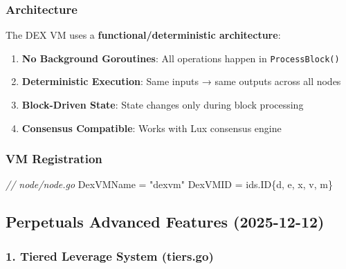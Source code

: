 \documentclass[
]{article}
\newenvironment{Shaded}{}{}
\newcommand{\CharTok}[1]{\textcolor[rgb]{0.25,0.44,0.63}{#1}}
\newcommand{\CommentTok}[1]{\textcolor[rgb]{0.38,0.63,0.69}{\textit{#1}}}
\newcommand{\NormalTok}[1]{#1}
\newcommand{\OperatorTok}[1]{\textcolor[rgb]{0.40,0.40,0.40}{#1}}
\newcommand{\StringTok}[1]{\textcolor[rgb]{0.25,0.44,0.63}{#1}}
\providecommand{\tightlist}{%
  \setlength{\itemsep}{0pt}\setlength{\parskip}{0pt}}
\begin{document}
\subsubsection{Architecture}\label{architecture}

The DEX VM uses a \textbf{functional/deterministic architecture}:

\begin{enumerate}
\def\labelenumi{\arabic{enumi}.}
\tightlist
\item
  \textbf{No Background Goroutines}: All operations happen in
  \texttt{ProcessBlock()}
\item
  \textbf{Deterministic Execution}: Same inputs → same outputs across
  all nodes
\item
  \textbf{Block-Driven State}: State changes only during block
  processing
\item
  \textbf{Consensus Compatible}: Works with Lux consensus engine
\end{enumerate}

\subsubsection{VM Registration}\label{vm-registration}

\begin{Shaded}
\begin{Highlighting}[]
\CommentTok{// node/node.go}
\NormalTok{DexVMName }\OperatorTok{=} \StringTok{"dexvm"}
\NormalTok{DexVMID   }\OperatorTok{=}\NormalTok{ ids}\OperatorTok{.}\NormalTok{ID}\OperatorTok{\{}\CharTok{\textquotesingle{}d\textquotesingle{}}\OperatorTok{,} \CharTok{\textquotesingle{}e\textquotesingle{}}\OperatorTok{,} \CharTok{\textquotesingle{}x\textquotesingle{}}\OperatorTok{,} \CharTok{\textquotesingle{}v\textquotesingle{}}\OperatorTok{,} \CharTok{\textquotesingle{}m\textquotesingle{}}\OperatorTok{\}}
\end{Highlighting}
\end{Shaded}

\subsection{Perpetuals Advanced Features
(2025-12-12)}\label{perpetuals-advanced-features-2025-12-12}

\subsubsection{1. Tiered Leverage System
(tiers.go)}\label{1-tiered-leverage-system-tiersgo}
\end{document}
